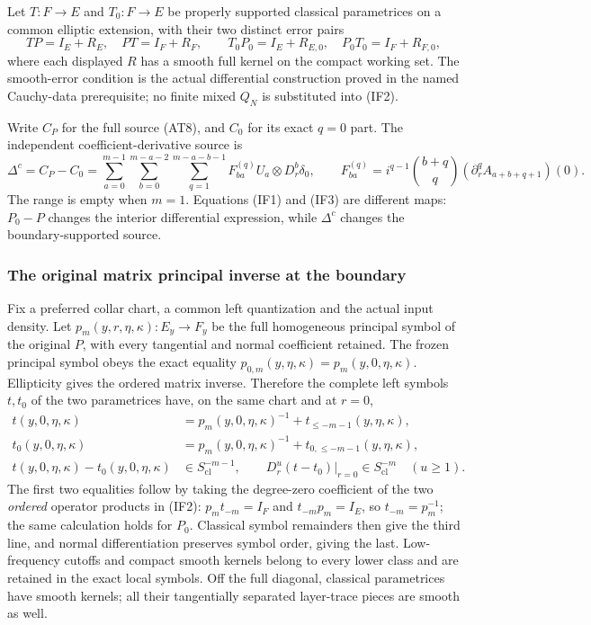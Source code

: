 \documentclass[
  11pt,
]{article}
\begin{document}
Let \(T:F\to E\) and \(T_0:F\to E\) be properly supported classical
parametrices on a common elliptic extension, with their two distinct
error pairs \[
 TP=I_E+R_E,\quad PT=I_F+R_F,\qquad
 T_0P_0=I_E+R_{E,0},\quad P_0T_0=I_F+R_{F,0},
 \tag{IF2}
\] where each displayed \(R\) has a smooth full kernel on the compact
working set. The smooth-error condition is the actual differential
construction proved in the named Cauchy-data prerequisite; no finite
mixed \(Q_N\) is substituted into (IF2).

Write \(C_P\) for the full source (AT8), and \(C_0\) for its exact
\(q=0\) part. The independent coefficient-derivative source is \[
 \Delta^c=C_P-C_0
 =\sum_{a=0}^{m-1}\sum_{b=0}^{m-a-2}
   \sum_{q=1}^{m-a-b-1}F_{ba}^{(q)}U_a\otimes D_r^b\delta_0,
 \qquad
 F_{ba}^{(q)}=i^{q-1}\binom{b+q}{q}
     (\partial_r^qA_{a+b+q+1})(0).
 \tag{IF3}
\] The range is empty when \(m=1\). Equations (IF1) and (IF3) are
different maps: \(P_0-P\) changes the interior differential expression,
while \(\Delta^c\) changes the boundary-supported source.

\subsubsection{The original matrix principal inverse at the
boundary}\label{the-original-matrix-principal-inverse-at-the-boundary}

Fix a preferred collar chart, a common left quantization and the actual
input density. Let \(p_m(y,r,\eta,\kappa):E_y\to F_y\) be the full
homogeneous principal symbol of the original \(P\), with every
tangential and normal coefficient retained. The frozen principal symbol
obeys the exact equality
\(p_{0,m}(y,\eta,\kappa)=p_m(y,0,\eta,\kappa)\). Ellipticity gives the
ordered matrix inverse. Therefore the complete left symbols \(t,t_0\) of
the two parametrices have, on the same chart and at \(r=0\), \[
 \begin{aligned}
 t(y,0,\eta,\kappa)
   &=p_m(y,0,\eta,\kappa)^{-1}+t_{\leq-m-1}(y,\eta,\kappa),\\
 t_0(y,0,\eta,\kappa)
   &=p_m(y,0,\eta,\kappa)^{-1}+t_{0,\leq-m-1}(y,\eta,\kappa),\\
 t(y,0,\eta,\kappa)-t_0(y,0,\eta,\kappa)
   &\in S_{\mathrm{cl}}^{-m-1},\qquad
 D_r^u(t-t_0)|_{r=0}\in S_{\mathrm{cl}}^{-m}\quad(u\geq1).
 \end{aligned}
 \tag{IF4}
\] The first two equalities follow by taking the degree-zero coefficient
of the two \emph{ordered} operator products in (IF2): \(p_m t_{-m}=I_F\)
and \(t_{-m}p_m=I_E\), so \(t_{-m}=p_m^{-1}\); the same calculation
holds for \(P_0\). Classical symbol remainders then give the third line,
and normal differentiation preserves symbol order, giving the last.
Low-frequency cutoffs and compact smooth kernels belong to every lower
class and are retained in the exact local symbols. Off the full
diagonal, classical parametrices have smooth kernels; all their
tangentially separated layer-trace pieces are smooth as well.
\end{document}
